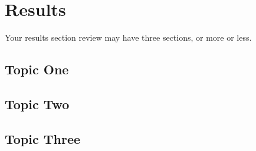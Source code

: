 \chapter{Results}
\label{cha:Results}      %

Your results section review may have three sections, or more or less.

\section{Topic One}
\lipsum
\section{Topic Two}
\lipsum
\section{Topic Three}
\lipsum